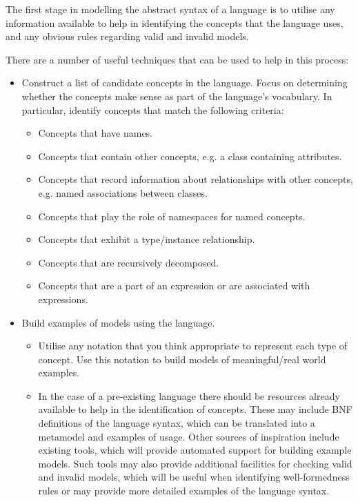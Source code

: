 The first stage in modelling the abstract syntax of a language is
to utilise any information available to help in identifying the
concepts that the language uses, and any obvious rules regarding
valid and invalid models.

There are a number of useful techniques that can be used to help in
this process:

\begin{itemize}

\item Construct a list of candidate concepts in the language.
Focus on determining whether the concepts make sense as part of
the language's vocabulary. In particular, identify concepts
that match the following criteria:

\begin{itemize}
  \item Concepts that have names.
   \item Concepts that contain other concepts, e.g. a class containing attributes.
  \item Concepts that record information about relationships with other concepts, e.g. named associations between classes.
  \item Concepts that play the role of namespaces for named concepts.
  \item Concepts that exhibit a type/instance relationship.
  \item Concepts that are recursively decomposed.
  \item Concepts that are a part of an expression or are associated with expressions.
\end{itemize}

\item Build examples of models using the language.

\begin{itemize}
\item Utilise any notation that you think appropriate to represent
each type of concept. Use this notation to build models of meaningful/real world examples.
\item In the case of a pre-existing language there should be
resources already available to help in the identification of
concepts. These may include BNF definitions of the language
syntax, which can be translated into a metamodel and examples of
usage. Other sources of inspiration include existing tools, which
will provide automated support for building example models. Such
tools may also provide additional facilities for checking valid
and invalid models, which will be useful when identifying
well-formedness rules or may provide more detailed examples of the
language syntax.
\end{itemize}

\end{itemize}

